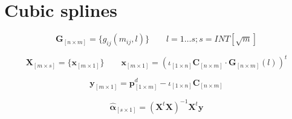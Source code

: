 \section{Cubic splines}
\label{sec:cubic-splines}


	$$\bm{G}_{\left[n \times m\right]} = \{  g_{ij}(m_{ij},l) \} \qquad   l = 1\dots s ; s= INT[\sqrt{m}]$$

	

	$$\bm{X}_{\left[m \times s\right]}=\{ \bm{x}_{\left[m \times 1\right]} \} \qquad  \bm{x}_{\left[m \times 1\right]} = \left( \iota_{\left[1\times n\right]} \bm{C}_{\left[n\times m\right]} \cdot \bm{G}_{\left[n\times m\right]}(l) \right)^t$$

	

	$$\bm{y}_{\left[m \times 1\right]}=  \bm{p}^d_{\left[1\times m\right]}  - \iota_{\left[1\times n\right]} \bm{C}_{\left[n\times m\right]}   $$

	

	$$\bm{\hat \alpha}_{\left[s \times 1\right]}= \left( \bm{X}^t   \bm{X}\right )^{-1}\bm{X}^t \bm{y}$$



